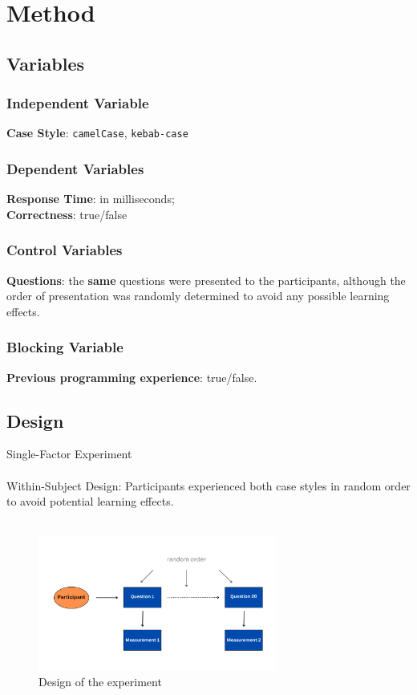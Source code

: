 \documentclass[unicode,11pt,a4paper,oneside,numbers=endperiod,openany]{scrartcl}
\begin{document}
\section{Method}

\subsection{Variables}
\subsubsection{Independent Variable}
\textbf{Case Style}: \texttt{camelCase}, \texttt{kebab-case}

\subsubsection{Dependent Variables}
\textbf{Response Time}: in milliseconds; \\
\textbf{Correctness}: true/false

\subsubsection{Control Variables}
\textbf{Questions}: the \textbf{same} questions were presented to the participants, although the order of presentation was randomly determined to avoid any possible learning effects.\\

\subsubsection{Blocking Variable}
\textbf{Previous programming experience}: true/false.

\subsection{Design}
Single-Factor Experiment \\
\hfill \\
Within-Subject Design: Participants experienced both case styles in random order to avoid potential learning effects.
\\
\hfill \\
\begin{figure}[h!]
    \centering
    \includegraphics[width=0.7\textwidth]{./figures/graph.pdf}
    \caption{Design of the experiment}
    \label{fig:graph}
\end{figure}
\end{document}
